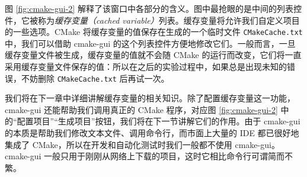 图 \ref{fig:cmake-gui-2} 解释了该窗口中各部分的含义。图中最抢眼的是中间的列表控件，它被称为\emph{缓存变量（cached variable）}列表。缓存变量将允许我们自定义项目的一些选项。CMake 将缓存变量的值保存在生成的一个临时文件 \lstinline[language={}]{CMakeCache.txt} 中，我们可以借助 cmake-gui 的这个列表控件方便地修改它们。一般而言，一旦缓存变量文件被生成，缓存变量的值就不会随 CMake 的运行而改变，它们将一直采用缓存变量文件保存的值：所以在之后的实验过程中，如果总是出现未知的错误，不妨删除 \lstinline[language={}]{CMakeCache.txt} 后再试一次。


我们将在下一章中详细讲解缓存变量的相关知识。除了配置缓存变量这一功能，cmake-gui 还能帮助我们调用真正的 CMake 程序，对应图 \ref{fig:cmake-gui-2} 中的“配置项目”“生成项目”按钮，我们将在下一节讲解它们的作用。由于 cmake-gui 的本质是帮助我们修改文本文件、调用命令行，而市面上大量的 IDE 都已很好地集成了 CMake，所以在开发和自动化测试时我们一般都不使用 cmake-gui。cmake-gui 一般只用于刚刚从网络上下载的项目，这时它相比命令行可谓简而不繁。
